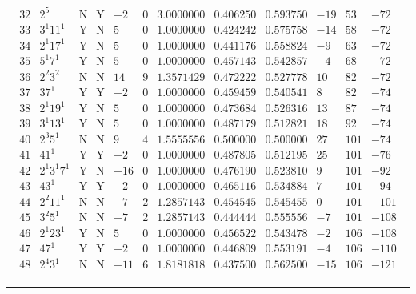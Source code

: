 \documentclass[11pt,reqno,a4letter]{article}
\numberwithin{figure}{section}
\numberwithin{table}{section}
\theoremstyle{plain}
\numberwithin{theorem}{section}
\theoremstyle{definition}
\begin{document}
\begin{table}[ht!]
\begin{equation*}
{\begin{array}{cc|cc|ccc|cc|ccc}
 32 & 2^5 & \text{N} & \text{Y} & -2 & 0 & 3.0000000 & 0.406250 & 0.593750 & -19 & 53 & -72 \\
 33 & 3^1 11^1 & \text{Y} & \text{N} & 5 & 0 & 1.0000000 & 0.424242 & 0.575758 & -14 & 58 & -72 \\
 34 & 2^1 17^1 & \text{Y} & \text{N} & 5 & 0 & 1.0000000 & 0.441176 & 0.558824 & -9 & 63 & -72 \\
 35 & 5^1 7^1 & \text{Y} & \text{N} & 5 & 0 & 1.0000000 & 0.457143 & 0.542857 & -4 & 68 & -72 \\
 36 & 2^2 3^2 & \text{N} & \text{N} & 14 & 9 & 1.3571429 & 0.472222 & 0.527778 & 10 & 82 & -72 \\
 37 & 37^1 & \text{Y} & \text{Y} & -2 & 0 & 1.0000000 & 0.459459 & 0.540541 & 8 & 82 & -74 \\
 38 & 2^1 19^1 & \text{Y} & \text{N} & 5 & 0 & 1.0000000 & 0.473684 & 0.526316 & 13 & 87 & -74 \\
 39 & 3^1 13^1 & \text{Y} & \text{N} & 5 & 0 & 1.0000000 & 0.487179 & 0.512821 & 18 & 92 & -74 \\
 40 & 2^3 5^1 & \text{N} & \text{N} & 9 & 4 & 1.5555556 & 0.500000 & 0.500000 & 27 & 101 & -74 \\
 41 & 41^1 & \text{Y} & \text{Y} & -2 & 0 & 1.0000000 & 0.487805 & 0.512195 & 25 & 101 & -76 \\
 42 & 2^1 3^1 7^1 & \text{Y} & \text{N} & -16 & 0 & 1.0000000 & 0.476190 & 0.523810 & 9 & 101 & -92 \\
 43 & 43^1 & \text{Y} & \text{Y} & -2 & 0 & 1.0000000 & 0.465116 & 0.534884 & 7 & 101 & -94 \\
 44 & 2^2 11^1 & \text{N} & \text{N} & -7 & 2 & 1.2857143 & 0.454545 & 0.545455 & 0 & 101 & -101 \\
 45 & 3^2 5^1 & \text{N} & \text{N} & -7 & 2 & 1.2857143 & 0.444444 & 0.555556 & -7 & 101 & -108 \\
 46 & 2^1 23^1 & \text{Y} & \text{N} & 5 & 0 & 1.0000000 & 0.456522 & 0.543478 & -2 & 106 & -108 \\
 47 & 47^1 & \text{Y} & \text{Y} & -2 & 0 & 1.0000000 & 0.446809 & 0.553191 & -4 & 106 & -110 \\
 48 & 2^4 3^1 & \text{N} & \text{N} & -11 & 6 & 1.8181818 & 0.437500 & 0.562500 & -15 & 106 & -121 \\ 
\end{array}
}
\end{equation*}

\bigskip\hrule\smallskip 


\end{table}
\end{document}
